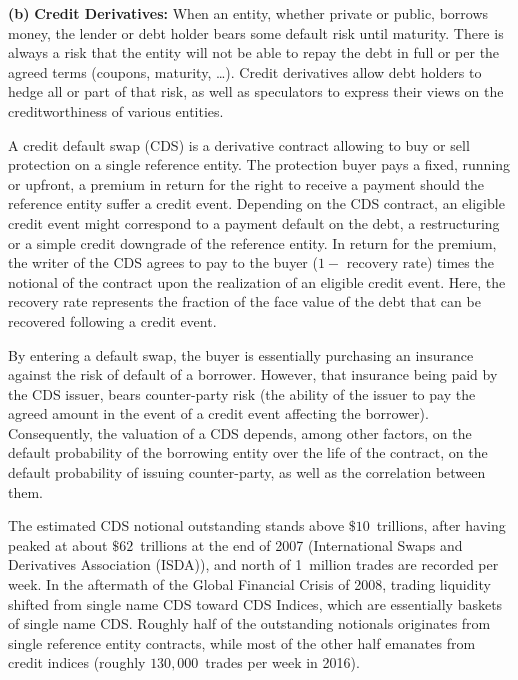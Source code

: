 \noindent\textbf{(b)} \textbf{Credit Derivatives:} When an entity, whether private or public, borrows money, the lender or debt holder bears some default risk until maturity. There is always a risk that the entity will not be able to repay the debt in full or per the agreed terms (coupons, maturity, \dots). Credit derivatives allow debt holders to hedge all or part of that risk, as well as speculators to express their views on the creditworthiness of various entities. 


A credit default swap (CDS) is a derivative contract allowing to buy or sell protection on a single reference entity. The protection buyer pays a fixed, running or upfront, a premium in return for the right to receive a payment should the reference entity suffer a credit event. Depending on the CDS contract, an eligible credit event might correspond to a payment default on the debt, a restructuring or a simple credit downgrade of the reference entity. In return for the premium, the writer of the CDS agrees to pay to the buyer ($1 - \text{ recovery rate}$) times the notional of the contract upon the realization of an eligible credit event. Here, the recovery rate represents the fraction of the face value of the debt that can be recovered following a credit event.


By entering a default swap, the buyer is essentially purchasing an insurance against the risk of default of a borrower. However, that insurance being paid by the CDS issuer, bears counter-party risk (the ability of the issuer to pay the agreed amount in the event of a credit event affecting the borrower). Consequently, the valuation of a CDS depends, among other factors, on the default probability of the borrowing entity over the life of the contract, on the default probability of issuing counter-party, as well as the correlation between them.


The estimated CDS notional outstanding stands above $\$10$~trillions, after having peaked at about $\$62$~trillions at the end of 2007 (International Swaps and Derivatives Association (ISDA)), and north of 1~million trades are recorded per week. In the aftermath of the Global Financial Crisis of 2008, trading liquidity shifted from single name CDS toward CDS Indices, which are essentially baskets of single name CDS. Roughly half of the outstanding notionals originates from single reference entity contracts, while most of the other half emanates from credit indices (roughly $130,000$~trades per week in 2016).


